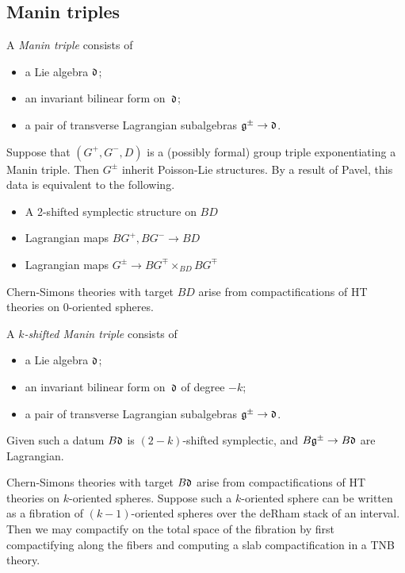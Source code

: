 \documentclass[12pt]{amsart}
\begin{document}
\subsection{Manin triples}

\begin{dfn} 
A \emph{Manin triple} consists of
\begin{itemize}
\item a Lie algebra $\mathfrak d$;
\item an invariant bilinear form on~$\mathfrak d$;
\item a pair of transverse Lagrangian subalgebras $\mathfrak g^\pm \to \mathfrak d$.
\end{itemize}
\end{dfn}

Suppose that $(G^+, G^-, D)$ is a (possibly formal) group triple exponentiating a Manin triple. Then $G^\pm$ inherit Poisson-Lie structures. By a result of Pavel, this data is equivalent to the following. 

\begin{itemize}
\item A 2-shifted symplectic structure on $BD$
\item Lagrangian maps $BG^+, BG^- \to BD$
\item Lagrangian maps $G^\pm \to BG^\mp\times_{BD} BG^\mp$
\end{itemize}

Chern-Simons theories with target $BD$ arise from compactifications of HT theories on $0$-oriented spheres.
\begin{dfn} 
A \emph{$k$-shifted Manin triple} consists of
\begin{itemize}
\item a Lie algebra $\mathfrak d$;
\item an invariant bilinear form on~$\mathfrak d$ of degree $-k$;
\item a pair of transverse Lagrangian subalgebras $\mathfrak g^\pm \to \mathfrak d$.
\end{itemize}
\end{dfn}

Given such a datum $B\mathfrak d$ is $(2-k)$-shifted symplectic, and $B\mathfrak g^\pm\to B\mathfrak d$ are Lagrangian. 

Chern-Simons theories with target $B\mathfrak d$ arise from compactifications of HT theories on $k$-oriented spheres. Suppose such a $k$-oriented sphere can be written as a fibration of $(k-1)$-oriented spheres over the deRham stack of an interval. Then we may compactify on the total space of the fibration by first compactifying along the fibers and computing a slab compactification in a TNB theory.
\end{document}
